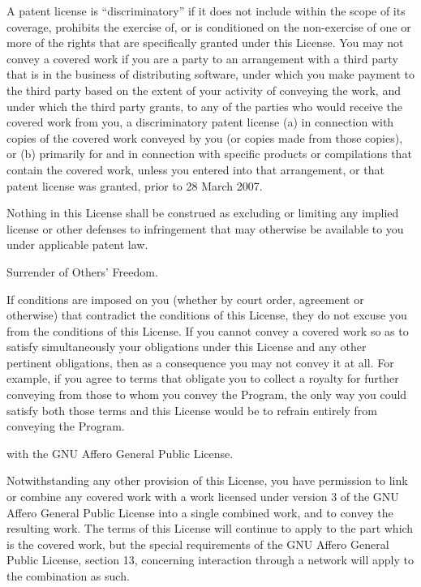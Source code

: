A patent license is ``discriminatory'' if it does not include within the
scope of its coverage, prohibits the exercise of, or is conditioned on
the non-exercise of one or more of the rights that are specifically
granted under this License.  You may not convey a covered work if you
are a party to an arrangement with a third party that is in the
business of distributing software, under which you make payment to the
third party based on the extent of your activity of conveying the
work, and under which the third party grants, to any of the parties
who would receive the covered work from you, a discriminatory patent
license (a) in connection with copies of the covered work conveyed by
you (or copies made from those copies), or (b) primarily for and in
connection with specific products or compilations that contain the
covered work, unless you entered into that arrangement, or that patent
license was granted, prior to 28 March 2007.

Nothing in this License shall be construed as excluding or limiting
any implied license or other defenses to infringement that may
otherwise be available to you under applicable patent law.

\itemNo Surrender of Others' Freedom.

If conditions are imposed on you (whether by court order, agreement or
otherwise) that contradict the conditions of this License, they do not
excuse you from the conditions of this License.  If you cannot convey
a covered work so as to satisfy simultaneously your obligations under
this License and any other pertinent obligations, then as a
consequence you may not convey it at all.  For example, if you agree
to terms that obligate you to collect a royalty for further conveying
from those to whom you convey the Program, the only way you could
satisfy both those terms and this License would be to refrain entirely
from conveying the Program.

\itemUse with the GNU Affero General Public License.

Notwithstanding any other provision of this License, you have
permission to link or combine any covered work with a work licensed
under version 3 of the GNU Affero General Public License into a single
combined work, and to convey the resulting work.  The terms of this
License will continue to apply to the part which is the covered work,
but the special requirements of the GNU Affero General Public License,
section 13, concerning interaction through a network will apply to the
combination as such.


